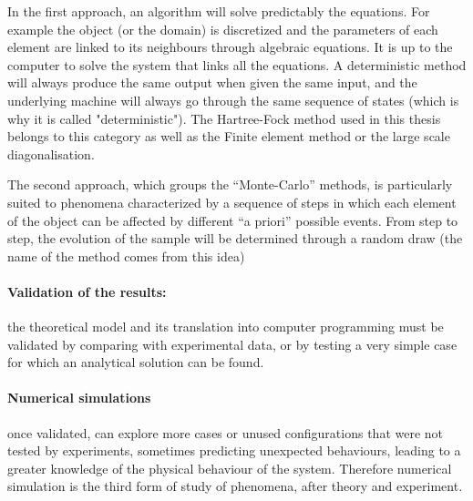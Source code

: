 In the first approach, an algorithm will solve predictably the equations. For example the object (or the domain) is discretized and the parameters of each element are linked to its neighbours through algebraic equations. It is up to the computer to solve the system that links all the equations. A deterministic method will always produce the same output when given the same input, and the underlying machine will always go through the same sequence of states (which is why it is called "deterministic"). The Hartree-Fock method used in this thesis belongs to this category as well as the Finite element method or the large scale diagonalisation.

The second approach, which groups the “Monte-Carlo” methods, is particularly suited to phenomena characterized by a sequence of steps in which each element of the object can be affected by different “a priori” possible events. From step to step, the evolution of the sample will be determined through a random draw (the name of the method comes from this idea)


\paragraph{Validation of the results:}
 the theoretical model and its translation into computer programming must be validated by comparing with experimental data, or by testing a very simple case for which an analytical solution can be found.

\paragraph{ Numerical simulations} once validated, can explore more cases or unused configurations that were not tested by experiments, sometimes predicting unexpected behaviours, leading to a greater knowledge of the physical behaviour of the system.
Therefore numerical simulation is the third form of study of phenomena, after theory and experiment. 


